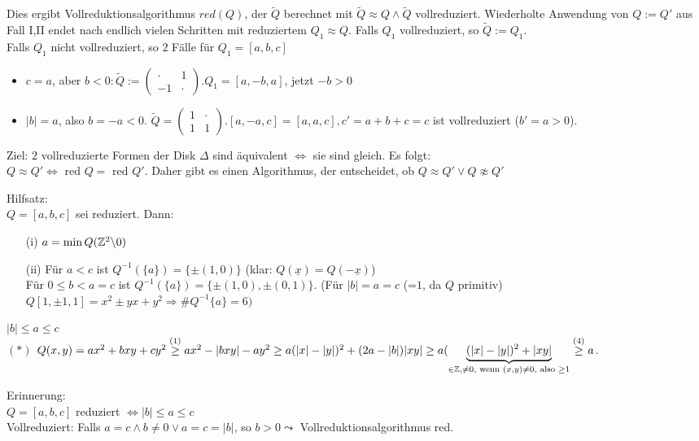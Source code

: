 \documentclass[a4paper,DIV15,BCOR12mm]{article}
\begin{document}
Dies ergibt Vollreduktionsalgorithmus $red(Q)$, der $\tilde Q$ berechnet mit $\tilde Q \approx Q \wedge \tilde Q$ vollreduziert. Wiederholte Anwendung von $Q := Q'$ aus Fall I,II endet nach endlich vielen Schritten mit reduziertem $Q_1 \approx Q$. Falls $Q_1$ vollreduziert, so $\tilde Q := Q_1$.\\
Falls $Q_1$ nicht vollreduziert, so $2$ Fälle für $Q_1 = [a,b,c]$
\begin{itemize}
\item $c = a$, aber $b < 0: \tilde Q := \begin{pmatrix}\cdot & 1 \\ -1 & \cdot\end{pmatrix}.Q_1 = [a,-b,a]$, jetzt $-b > 0$
\item $|b| = a$, also $b = -a < 0$. $\tilde Q = \begin{pmatrix}1 & \cdot\\1 & 1\end{pmatrix}.[a,-a,c] = [a,a,c], c' = a+b+c = c$ ist vollreduziert ($b' = a > 0$).
\end{itemize}
Ziel: $2$ vollreduzierte Formen der Disk $\Delta$ sind äquivalent $\Leftrightarrow$ sie sind gleich. Es folgt:\\
$Q \approx Q' \Leftrightarrow \text{ red }Q = \text{ red }Q'$. Daher gibt es einen Algorithmus, der entscheidet, ob $Q \approx Q' \vee Q \not\approx Q'$

Hilfsatz:\\
$Q = [a, b, c]$ sei reduziert. Dann:
\begin{itemize}
\item[(i)] $a = \min Q(\mathbb{Z}^2 \backslash 0)$
\item[(ii)] Für $a < c$ ist $Q^{-1}(\{a\}) = \{\pm(1,0)\}$ (klar: $Q(\underline x) = Q(-\underline x)$)\\
Für $0 \le b < a = c$ ist $Q^{-1}(\{a\}) = \{\pm (1,0), \pm (0,1)\}$. (Für $|b| = a = c$ (=$1$, da $Q$ primitiv) $Q[1, \pm 1, 1] = x^2 \pm yx + y^2 \Rightarrow \# Q^{-1}\{a\} = 6)$\\
\end{itemize}
$|b| \le a \le c$\\
$(\ast)$ $Q(x,y) = ax^2 + bxy + cy^2 \stackrel{(1)}{\ge} ax^2 - |bxy| - ay^2 \ge a(|x|-|y|)^2 + (2a - |b|)|xy| \ge a(\underbrace{(|x|-|y|)^2 + |xy|}_{\in \mathbb{Z}, \not= 0, \text{ wenn } (x,y) \not= 0, \text{ also } \ge 1} \stackrel{(4)}{\ge} a$.



Erinnerung:\\
$Q = [a,b,c]$ reduziert $\Leftrightarrow |b| \le a \le c$\\
Vollreduziert: Falls $a = c \wedge b \not= 0 \vee a = c = |b|$, so $b > 0 \leadsto$ Vollreduktionsalgorithmus red.
\end{document}
